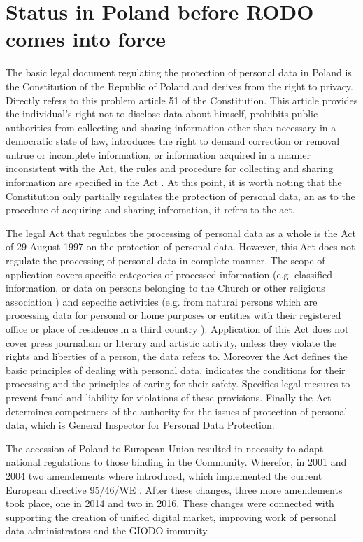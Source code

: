 \documentclass[en, noamssymb]{mgr}
\begin{document}
\section{Status in Poland before RODO comes into force}

The basic legal document regulating the protection of personal data in Poland is the Constitution of the Republic of Poland and derives from the right to privacy. Directly refers to this problem article 51 of the Constitution. This article provides the individual's right not to disclose data about himself, prohibits public authorities from collecting and sharing information other than necessary in a democratic state of law, introduces the right to demand correction or removal untrue or incomplete information, or information acquired in a manner inconsistent with the Act, the rules and procedure for collecting and sharing information are specified in the Act \cite{konstytucja_art51}. At this point, it is worth noting that the Constitution only partially regulates the protection of personal data, an as to the procedure of acquiring and sharing infromation, it refers to the act. 

\indent The legal Act that regulates the processing of personal data as a whole is the Act of 29 August 1997 on the protection of personal data. However, this Act does not regulate the processing of personal data in complete manner. The scope of application covers specific categories of processed information (e.g. classified information, or data on persons belonging to the Church or other religious association \cite{prawo_odo}) and sepecific activities (e.g. from natural persons which are processing data for personal or home purposes or entities with their registered office or place of  residence in a third country \cite{prawo_odo}). Application of this Act does not cover press journalism or literary and artistic activity, unless they violate the rights and liberties of a person, the data refers to. Moreover the Act defines the basic principles of dealing with personal data, indicates the conditions for their processing and the principles of caring for their safety. Specifies legal mesures to prevent fraud and liability for violations of these provisions. Finally the Act determines competences of the authority for the issues of protection of personal data, which is General Inspector for Personal Data Protection. 

\indent The accession of Poland to European Union resulted in necessity to adapt national regulations to those binding in the Community. Wherefor, in 2001 and 2004 two amendements where introduced, which implemented the current European directive 95/46/WE \cite{prawo_odo}. After these changes, three more amendements took place, one in 2014 and two in 2016. These changes were connected with supporting the creation of unified digital market, improving work of personal data administrators and the GIODO immunity.
\end{document}
